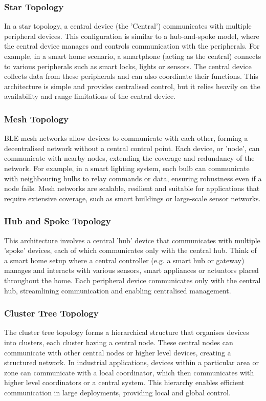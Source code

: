 \subsubsection{Star Topology}
In a star topology, a central device (the 'Central') communicates with multiple peripheral devices. This configuration is similar to a hub-and-spoke model, where the central device manages and controls communication with the peripherals. For example, in a smart home scenario, a smartphone (acting as the central) connects to various peripherals such as smart locks, lights or sensors. The central device collects data from these peripherals and can also coordinate their functions. This architecture is simple and provides centralised control, but it relies heavily on the availability and range limitations of the central device.

\subsubsection{Mesh Topology}
BLE mesh networks allow devices to communicate with each other, forming a decentralised network without a central control point. Each device, or 'node', can communicate with nearby nodes, extending the coverage and redundancy of the network. For example, in a smart lighting system, each bulb can communicate with neighbouring bulbs to relay commands or data, ensuring robustness even if a node fails. Mesh networks are scalable, resilient and suitable for applications that require extensive coverage, such as smart buildings or large-scale sensor networks.

\subsubsection{Hub and Spoke Topology}
This architecture involves a central 'hub' device that communicates with multiple 'spoke' devices, each of which communicates only with the central hub. Think of a smart home setup where a central controller (e.g. a smart hub or gateway) manages and interacts with various sensors, smart appliances or actuators placed throughout the home. Each peripheral device communicates only with the central hub, streamlining communication and enabling centralised management.

\subsubsection{Cluster Tree Topology}
The cluster tree topology forms a hierarchical structure that organises devices into clusters, each cluster having a central node. These central nodes can communicate with other central nodes or higher level devices, creating a structured network. In industrial applications, devices within a particular area or zone can communicate with a local coordinator, which then communicates with higher level coordinators or a central system. This hierarchy enables efficient communication in large deployments, providing local and global control.

